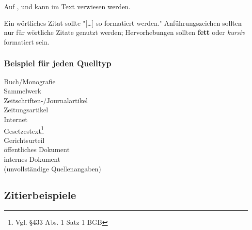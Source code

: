 

Auf ,  und  kann im Text verwiesen werden.%

Ein wörtliches Zitat sollte "[\ldots] so formatiert werden."
Anführungszeichen sollten nur für wörtliche Zitate genutzt werden; Hervorhebungen sollten \textbf{fett} oder \textit{kursiv} formatiert sein.

\newpage
\subsubsection{Beispiel für jeden Quelltyp}%

Buch/Monografie\\
Sammelwerk\\
Zeitschriften-/Journalartikel\\
Zeitungsartikel\\
Internet\\%
Gesetzestext\footnote{Vgl. §433 Abs. 1 Satz 1 BGB}\nocite{bgb}\\
Gerichtsurteil\\
öffentliches Dokument\\
internes Dokument\\%
(unvollständige Quellenangaben)

\newpage
\subsection{Zitierbeispiele}
